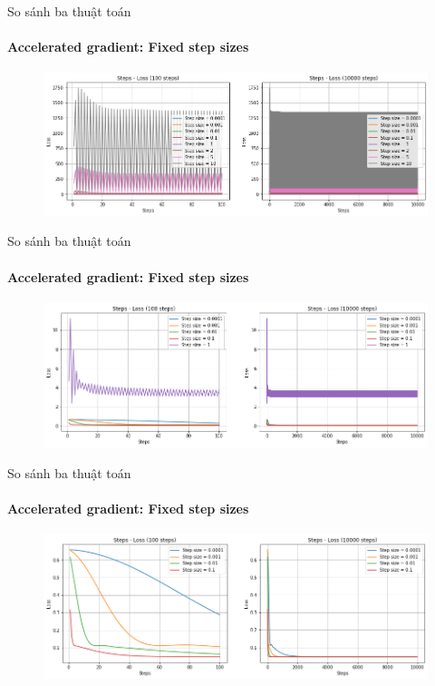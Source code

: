 \documentclass[10pt]{beamer}
\theoremstyle{remark}
\theoremstyle{definition}
\begin{document}
\begin{frame}{So sánh ba thuật toán}
	\framesubtitle{Accelerated gradient: Fixed step sizes}

	\begin{figure}[h!]
		\centering
		\includegraphics[width=12cm]{Thinh/15.png}
	\end{figure}

\end{frame}
\begin{frame}{So sánh ba thuật toán}
	\framesubtitle{Accelerated gradient: Fixed step sizes}

	\begin{figure}[h!]
		\centering
		\includegraphics[width=12cm]{Thinh/16.png}
	\end{figure}

\end{frame}
\begin{frame}{So sánh ba thuật toán}
	\framesubtitle{Accelerated gradient: Fixed step sizes}

	\begin{figure}[h!]
		\centering
		\includegraphics[width=12cm]{Thinh/17.png}
	\end{figure}

\end{frame}
\end{document}
